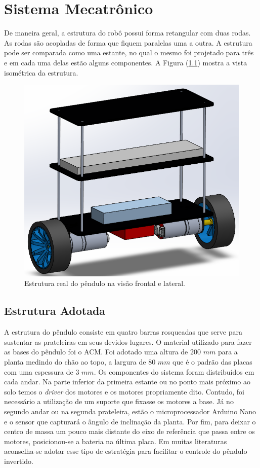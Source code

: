 \chapter{Sistema Mecatrônico}\label{cap:Metodologia}

De maneira geral, a estrutura do robô possui forma retangular com duas rodas. As rodas são acopladas de forma que fiquem paralelas uma a outra. A estrutura pode ser comparada como uma estante, no qual o mesmo foi projetado para três e em cada uma delas estão alguns componentes.  A Figura (\ref{fig:EstruturaRealVisaoFrontalLateral}) mostra a vista isométrica da estrutura.
\begin{figure}[H]
    \centering
    \includegraphics[scale=0.6]{Metodologia/Pendulo_3D.PNG}
    \caption{Estrutura real do pêndulo na visão frontal e lateral.}
    \label{fig:EstruturaRealVisaoFrontalLateral}
\end{figure}

\section{Estrutura Adotada}\label{sec:EstruturaCAD}

A estrutura do pêndulo consiste em quatro barras rosqueadas que serve para sustentar as prateleiras em seus devidos lugares. O material utilizado para fazer as bases do pêndulo foi o ACM. Foi adotado uma altura de 200 $mm$ para a planta medindo do chão ao topo, a largura de 80 $mm$ que é o padrão das placas com uma espessura de 3 $mm$. 
Os componentes do sistema foram distribuídos em cada andar. Na parte inferior da primeira estante ou no ponto mais próximo ao solo temos o \textit{driver} dos motores e os motores propriamente dito. Contudo, foi necessário a utilização de um suporte que fixasse os motores a base. Já no segundo andar ou na segunda prateleira, estão o microprocessador Arduino Nano e o sensor que capturará o ângulo de inclinação da planta. Por fim, para deixar o centro de massa um pouco mais distante do eixo de referência que passa entre os motores, posicionou-se a bateria na última placa. Em muitas literaturas aconselha-se adotar esse tipo de estratégia para facilitar o controle do pêndulo invertido.

